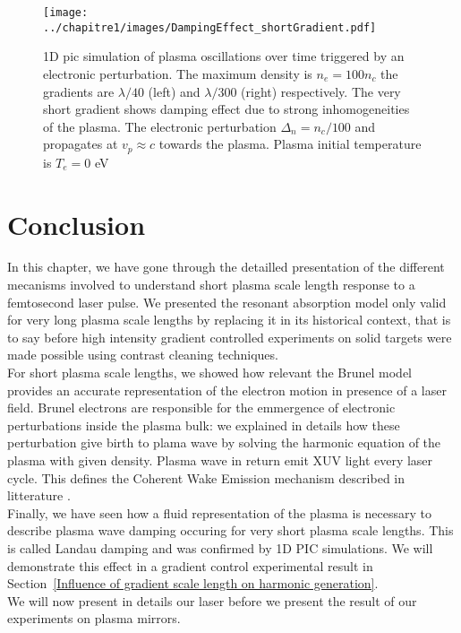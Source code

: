 \begin{figure}[H]
\centering
\texttt{[image: ../chapitre1/images/DampingEffect\_shortGradient.pdf]}\\
\caption{\label{figDampingEffect_shortGradient}1D pic simulation of plasma oscillations over time triggered by an electronic perturbation. The maximum density is $n_e = 100 n_c$ the gradients are $\lambda /40$ (left) and $\lambda /300$ (right) respectively.
The very short gradient shows damping effect due to strong inhomogeneities of the plasma. The electronic perturbation $\Delta_n = n_c/100$ and propagates at $v_p\approx c$ towards the plasma. Plasma initial temperature is $T_e = 0$ eV}
\end{figure}




\section{Conclusion}

In this chapter, we have gone through the detailled presentation of the different mecanisms involved to understand short plasma scale length response to a femtosecond laser pulse. We presented the resonant absorption model only valid for very long plasma scale lengths by replacing it in its historical context, that is to say before high intensity gradient controlled experiments on solid targets were made possible using contrast cleaning techniques.\\

\noindent For short plasma scale lengths, we showed how relevant the Brunel model provides an accurate representation of the electron motion in presence of a laser field. Brunel electrons are responsible for the emmergence of electronic perturbations inside the plasma bulk: we explained in details how these perturbation give birth to plama wave by solving the harmonic equation of the plasma with given density. Plasma wave in return emit XUV light every laser cycle. This defines the Coherent Wake Emission mechanism described in litterature  \cite{thaury2010high,dromey2009tunable,nomura2009attosecond}. \\

\noindent Finally, we have seen how a fluid representation of the plasma is necessary to describe plasma wave damping occuring for very short plasma scale lengths. This is called Landau damping and was confirmed by 1D PIC simulations. We will demonstrate this effect in a gradient control experimental result in Section~\ref{Influence of gradient scale length on harmonic generation}.\\

\noindent  We will now present in details our laser before we present the result of our experiments on plasma mirrors.































